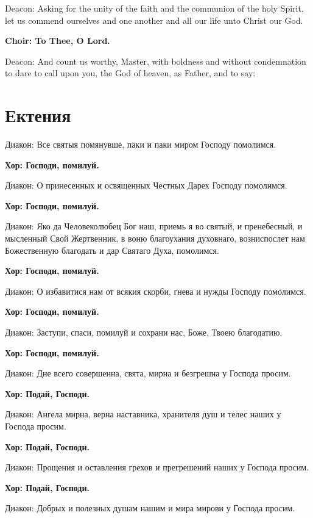 \documentclass[12pt,a4paper,titlepage]{report}
\begin{document}
\begin{paracol}[1]{2}
	Deacon: Asking for the unity of the faith and the communion of the holy Spirit, let us commend ourselves and one another and all our life unto Christ our God.
	
	\textbf{Choir: To Thee, O Lord.}
	
	Deacon: And count us worthy, Master, with boldness and without condemnation to dare to call upon you, the God of heaven, as Father, and to say:
	
	\switchcolumn[1]
	
	\section*{Ектения}
	
	Диакон: Все святыя помянувше, паки и паки миром Господу помолимся.
	
	\textbf{Хор: Господи, помилуй.}
	
	Диакон: О принесенных и освященных Честных Дарех Господу помолимся.
	
	\textbf{Хор: Господи, помилуй.}
	
	Диакон: Яко да Человеколюбец Бог наш, приемь я во святый, и пренебесный, и мысленный Свой Жертвенник, в воню благоухания духовнаго, возниспослет нам Божественную благодать и дар Святаго Духа, помолимся.
	
	\textbf{Хор: Господи, помилуй.}
	
	Диакон:	О избавитися нам от всякия скорби, гнева и нужды Господу помолимся.
	
	\textbf{Хор: Господи, помилуй.}
	
	Диакон:	Заступи, спаси, помилуй и сохрани нас, Боже, Твоею благодатию.
	
	\textbf{Хор: Господи, помилуй.}
	
	Диакон:	Дне всего совершенна, свята, мирна и безгрешна у Господа просим.
	
	\textbf{Хор: Подай, Господи.}
	
	Диакон:	Ангела мирна, верна наставника, хранителя душ и телес наших у Господа просим.
	
	\textbf{Хор: Подай, Господи.}
	
	Диакон:	Прощения и оставления грехов и прегрешений наших у Господа просим.
	
	\textbf{Хор: Подай, Господи.}
	
	Диакон:	Добрых и полезных душам нашим и мира мирови у Господа просим.
	

\end{paracol}
\end{document}
